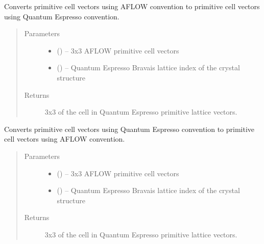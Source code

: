 \documentclass[letterpaper,10pt,english]{sphinxmanual}
\begin{document}
\begin{fulllineitems}
\label{\detokenize{retr:retr.prim_aflow2qe}}
Converts primitive cell vectors using AFLOW convention to primitive cell
vectors using Quantum Espresso convention.
\begin{quote}\begin{description}
\item[{Parameters}] \leavevmode\begin{itemize}
\item {} 
 () -- 3x3 AFLOW primitive cell vectors

\item {} 
 () -- Quantum Espresso Bravais lattice index of the crystal
structure

\end{itemize}

\item[{Returns}] \leavevmode
3x3  of the cell in Quantum Espresso primitive lattice
vectors.

\end{description}\end{quote}

\end{fulllineitems}


\begin{fulllineitems}
\label{\detokenize{retr:retr.prim_qe2aflow}}
Converts primitive cell vectors using Quantum Espresso convention to
primitive cell vectors using AFLOW convention.
\begin{quote}\begin{description}
\item[{Parameters}] \leavevmode\begin{itemize}
\item {} 
 () -- 3x3 AFLOW primitive cell vectors

\item {} 
 () -- Quantum Espresso Bravais lattice index of the crystal
structure

\end{itemize}

\item[{Returns}] \leavevmode
3x3  of the cell in Quantum Espresso primitive lattice
vectors.

\end{description}\end{quote}

\end{fulllineitems}
\end{document}
